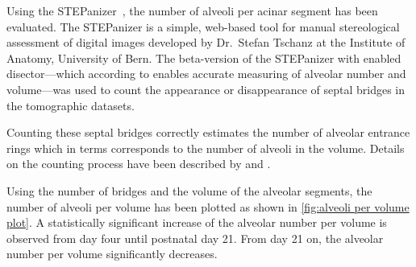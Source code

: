 Using the STEPanizer~\cite[available \href{http://stepanizer.com/}{online}]{Tschanz2010}, the number of alveoli per acinar segment has been evaluated. The STEP\-anizer is a simple, web-based tool for manual stereological assessment of digital images developed by Dr.\ Stefan Tschanz at the Institute of Anatomy, University of Bern. The beta-version of the STEPanizer with enabled disector---which according to \citet{Hsia2010} enables accurate measuring of alveolar number and volume---was used to count the appearance or disappearance of septal bridges in the tomographic datasets.

Counting these septal bridges correctly estimates the number of alveolar entrance rings which in terms corresponds to the number of alveoli in the volume. Details on the counting process have been described by \citet{Hyde2004} and \citet{Ochs2004}.

Using the number of bridges and the volume of the alveolar segments, the number of alveoli per volume has been plotted as shown in \autoref{fig:alveoli per volume plot}. A statistically significant increase of the alveolar number per volume is observed from day four until postnatal day 21. From day 21 on, the alveolar number per volume significantly decreases.

